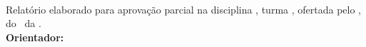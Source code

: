 \begin{center}
\autores
\vfill
{\bf\Large\titulo}\vspace{1cm}\\
{\raggedleft
\begin{minipage}[t]{0.53\textwidth}
Relatório elaborado para aprovação parcial na disciplina \disciplina, turma \turma, ofertada pelo \departamento, do \campus~da \universidade.
\vspace{12pt}\\
{\bf Orientador:} \prefixo~\orientador
\end{minipage}\\} 
\vfill
\local\\\data
\end{center}

